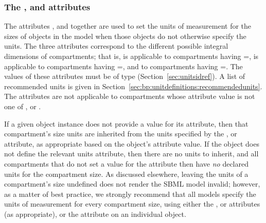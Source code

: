%


\subsubsection{The ,  and
   attributes}
\label{sec:model-volumeUnits}
\label{sec:model-areaUnits}
\label{sec:model-lengthUnits}

The attributes ,  and
 together are used to set the units of
measurement for the sizes of \Compartment objects in the model
when those objects do not otherwise specify the units.  The three
attributes correspond to the different possible integral
dimensions of compartments; that is,  is
applicable to compartments having
=,  is applicable
to compartments having =, and
 to compartments having
=.  The values of these attributes
must be of type 
(Section~\ref{sec:unitsidref}).  A list of recommended units is
given in Section~\ref{sec:bp:unitdefinitions:recommendedunits}.
The attributes are not applicable to compartments whose
 attribute value is not one of ,
 or .

If a given \Compartment object instance does not provide a value
for its  attribute, then that compartment's size
units are inherited from the units specified by the \Model
{},  or 
attribute, as appropriate based on the \Compartment object's
 attribute value.  If the \Model object
does not define the relevant units attribute, then there are no
units to inherit, and all compartments that do not set a value for
the \Compartment {} attribute then have \emph{no}
declared units for the compartment size.  As discussed elsewhere,
leaving the units of a compartment's size undefined does not
render the SBML model invalid; however, as a matter of best
practice, we strongly recommend that all models specify the units
of measurement for every compartment size, using either the \Model
{},  or 
attributes (as appropriate), or the  attribute on
an individual \Compartment object.

